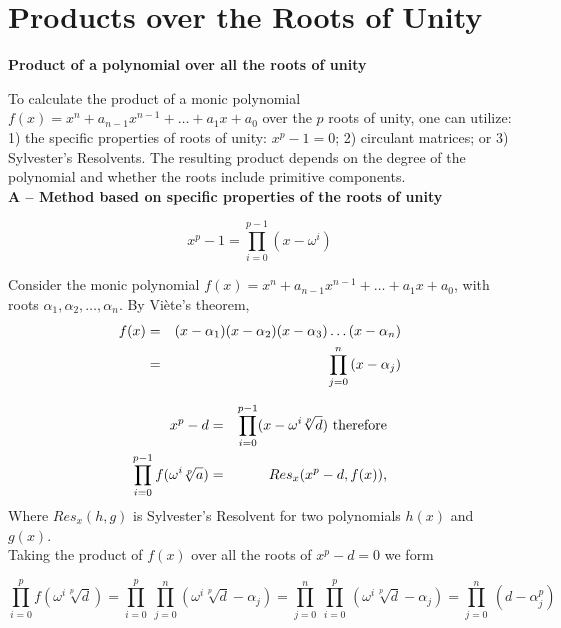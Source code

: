 \section{Products over the Roots of Unity}

{\bf Product of a polynomial over all the roots of unity}


To calculate the product of a monic polynomial \(f(x) = x^n + a_{n-1} x^{n-1} + \dots + a_1 x + a_0\) over the $p$ roots of unity, 
one can utilize: 1) the specific properties of roots of  unity: \(x^p - 1 = 0\); 2) circulant matrices; or 3) Sylvester's Resolvents. 
The resulting product depends on the degree of the polynomial and whether the roots include primitive components.\\

{\bf A -- Method based on specific properties of the roots of unity }

\[x^p - 1 = \prod_{i=0}^{p-1} (x - \omega^i ) \]

Consider the monic polynomial $f(x) =  x^n + a_{n-1} x^{n-1} + \hdots + a_1 x + a_0$, with roots $\alpha_1, \alpha_2, \hdots, \alpha_n$. 
By Vi\`ete's theorem,
\begin{eqnarray*}
f(x) &=&  (x - \alpha_1)(x-\alpha_2)(x-\alpha_3) \hdots (x- \alpha_n) \cr
&=& \prod_{j= 0}^n\, (x - \alpha_j) \cr
\end{eqnarray*}
  

\begin{eqnarray*}
x^p - d &=& \prod_{i=0}^{p-1} (x - \omega^i \sqrt[p]{d}) \mbox{ therefore} \cr
\prod_{i = 0}^{p-1} f(\omega^i \sqrt[p]{a}) &=& Res_x(x^p - d, f(x)),
\end{eqnarray*} Where $Res_x(h,g)$ is Sylvester's Resolvent for two polynomials $h(x)$ and $g(x)$. \\

Taking the product of $f(x)$ over all the roots  of $x^p - d = 0$  we form

\[ \prod_{i = 0}^p f(\omega^i \sqrt[p]{d} ) =  \prod_{i = 0}^p\  \prod_{j = 0}^n (\omega^i \sqrt[p]{d} - \alpha_j) =  \prod_{j = 0}^n  \ \prod_{i = 0}^p\, (\omega^i \sqrt[p]{d} - \alpha_j)  =  \prod_{j = 0}^n  \ (d - \alpha_j^p)   \] \\


